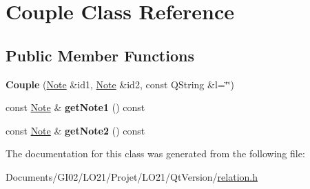 \hypertarget{class_couple}{}\section{Couple Class Reference}
\label{class_couple}
\subsection*{Public Member Functions}
\begin{DoxyCompactItemize}
\item 
\mbox{\label{class_couple_a0000c961b867947f39e76a6f0ea04527}} 
{\bfseries Couple} (\hyperlink{class_note}{Note} \&id1, \hyperlink{class_note}{Note} \&id2, const Q\+String \&l=\char`\"{}\char`\"{})
\item 
\mbox{\label{class_couple_ab1e111ccd47d953bce5a485a40f6e7d2}} 
const \hyperlink{class_note}{Note} \& {\bfseries get\+Note1} () const
\item 
\mbox{\label{class_couple_ad3d28199ad0170f65c4564a910167ed6}} 
const \hyperlink{class_note}{Note} \& {\bfseries get\+Note2} () const
\end{DoxyCompactItemize}


The documentation for this class was generated from the following file\+:\begin{DoxyCompactItemize}
\item 
Documents/\+G\+I02/\+L\+O21/\+Projet/\+L\+O21/\+Qt\+Version/\hyperlink{relation_8h}{relation.\+h}\end{DoxyCompactItemize}
